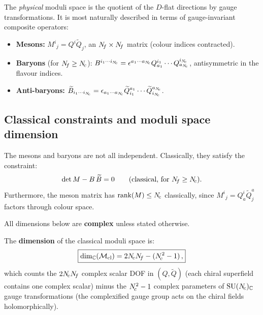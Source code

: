 \documentclass[11pt,a4paper]{article}
\begin{document}
The \emph{physical} moduli space is the quotient of the $D$-flat
directions by gauge transformations.  It is most naturally described
in terms of gauge-invariant composite operators:

\begin{definition}
\label{def:mesons-baryons}
\begin{itemize}
  \item \textbf{Mesons:}
    $M^i{}_j = Q^i \widetilde{Q}_j$,
    an $N_{\!f} \times N_{\!f}$ matrix (colour indices contracted).
  \item \textbf{Baryons} (for $N_{\!f} \geq N_{\!c}$):
    $B^{i_1 \cdots i_{N_{\!c}}}
    = \epsilon^{a_1 \cdots a_{N_{\!c}}} Q^{i_1}_{a_1} \cdots Q^{i_{N_{\!c}}}_{a_{N_{\!c}}}$,
    antisymmetric in the flavour indices.
  \item \textbf{Anti-baryons:}
    $\widetilde{B}_{i_1 \cdots i_{N_{\!c}}}
    = \epsilon_{a_1 \cdots a_{N_{\!c}}} \widetilde{Q}^{a_1}_{i_1}
    \cdots \widetilde{Q}^{a_{N_{\!c}}}_{i_{N_{\!c}}}$.
\end{itemize}
\end{definition}

\subsection{Classical constraints and moduli space dimension}
\label{sec:moduli-dim}

The mesons and baryons are not all independent.  Classically, they
satisfy the constraint:
\begin{equation}
  \det M - B\, \widetilde{B} = 0
  \qquad \text{(classical, for $N_{\!f} \geq N_{\!c}$)}.
  \label{eq:classical-constraint}
\end{equation}
Furthermore, the meson matrix has $\mathrm{rank}(M) \leq N_{\!c}$
classically, since $M^i{}_j = Q^i_a \widetilde{Q}^a_j$ factors through
colour space.

All dimensions below are \textbf{complex} unless stated otherwise.

The \textbf{dimension} of the classical moduli space is:
\begin{equation}
  \boxed{
    \dim_{\mathbb{C}}(\mathcal{M}_{\text{cl}})
    = 2N_{\!c} N_{\!f} - (N_{\!c}^2 - 1)\,,
  }
  \label{eq:moduli-dim}
\end{equation}
which counts the $2N_{\!c}N_{\!f}$ complex scalar DOF in $(Q, \widetilde{Q})$
(each chiral superfield contains one complex scalar) minus the
$N_{\!c}^2 - 1$ complex parameters of $\mathrm{SU}(N_{\!c})_{\mathbb{C}}$ gauge
transformations (the complexified gauge group acts on the chiral fields
holomorphically).
\end{document}
